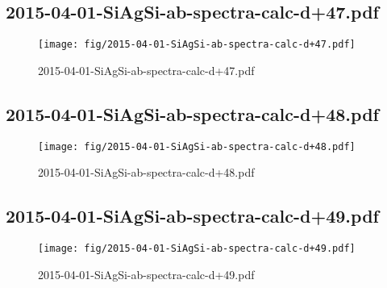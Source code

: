 \documentclass[fullscreen=true]{beamer}
\begin{document}
\subsection{2015-04-01-SiAgSi-ab-spectra-calc-d+47.pdf}
\begin{frame}
  \begin{figure}
    \texttt{[image: fig/2015-04-01-SiAgSi-ab-spectra-calc-d+47.pdf]}%
    \caption{2015-04-01-SiAgSi-ab-spectra-calc-d+47.pdf}
  \end{figure}
\end{frame}

\subsection{2015-04-01-SiAgSi-ab-spectra-calc-d+48.pdf}
\begin{frame}
  \begin{figure}
    \texttt{[image: fig/2015-04-01-SiAgSi-ab-spectra-calc-d+48.pdf]}%
    \caption{2015-04-01-SiAgSi-ab-spectra-calc-d+48.pdf}
  \end{figure}
\end{frame}

\subsection{2015-04-01-SiAgSi-ab-spectra-calc-d+49.pdf}
\begin{frame}
  \begin{figure}
    \texttt{[image: fig/2015-04-01-SiAgSi-ab-spectra-calc-d+49.pdf]}%
    \caption{2015-04-01-SiAgSi-ab-spectra-calc-d+49.pdf}
  \end{figure}
\end{frame}
\end{document}
